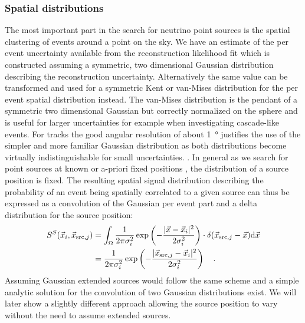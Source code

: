 \subsubsection*{Spatial distributions}
The most important part in the search for neutrino point sources is the spatial clustering of events around a point on the sky.
We have an estimate of the per event uncertainty available from the reconstruction likelihood fit which is constructed assuming a symmetric, two dimensional Gaussian distribution describing the reconstruction uncertainty.
Alternatively the same value can be transformed and used for a symmetric Kent or van-Mises distribution  for the per event spatial distribution instead.
The van-Mises distribution is the pendant of a symmetric two dimensional Gaussian but correctly normalized on the sphere and is useful for larger uncertainties for example when investigating cascade-like events.
For tracks the good angular resolution of about \SI{1}{\degree} justifies the use of the simpler and more familiar Gaussian distribution as both distributions become virtually indistinguishable for small uncertainties.
.
In general as we search for point sources at known or a-priori fixed positions , the distribution of a source position is fixed.
The resulting spatial signal distribution describing the probability of an event being spatially correlated to a given source can thus be expressed as a convolution of the Gaussian per event part and a delta distribution for the source position:
\begin{equation}
  \begin{aligned}
    S^S(\vec{x}_i, \vec{x}_{\mathrm{src},j}) &=
      \int_\Omega \frac{1}{2\pi \sigma_i^2}
      \exp\left(-\frac{|\vec{x}-\vec{x}_i|^2}{2\sigma_i^2}\right) \cdot
      \delta(\vec{x}_{\mathrm{src},j} - \vec{x}) \mathrm{d}\vec{x} \\
      &= \frac{1}{2\pi \sigma_i^2}
         \exp\left(-\frac{|\vec{x}_{\mathrm{src},j}-
                          \vec{x}_i|^2}{2\sigma_i^2}\right)
      \quad\text{.}
  \end{aligned}
\end{equation}
Assuming Gaussian extended sources would follow the same scheme and a simple analytic solution for the convolution of two Gaussian distributions exist.
We will later show a slightly different approach allowing the source position to vary without the need to assume extended sources.

